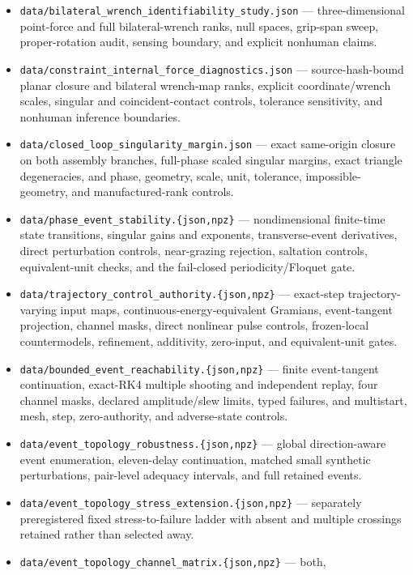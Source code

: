 \documentclass[
  letterpaper,
]{report}
\begin{document}
\begin{itemize}
  arrays.
\item
  \texttt{data/bilateral\_wrench\_identifiability\_study.json} ---
  three-dimensional point-force and full bilateral-wrench ranks, null
  spaces, grip-span sweep, proper-rotation audit, sensing boundary, and
  explicit nonhuman claims.
\item
  \texttt{data/constraint\_internal\_force\_diagnostics.json} ---
  source-hash-bound planar closure and bilateral wrench-map ranks,
  explicit coordinate/wrench scales, singular and coincident-contact
  controls, tolerance sensitivity, and nonhuman inference boundaries.
\item
  \texttt{data/closed\_loop\_singularity\_margin.json} --- exact
  same-origin closure on both assembly branches, full-phase scaled
  singular margins, exact triangle degeneracies, and phase, geometry,
  scale, unit, tolerance, impossible- geometry, and manufactured-rank
  controls.
\item
  \texttt{data/phase\_event\_stability.\{json,npz\}} --- nondimensional
  finite-time state transitions, singular gains and exponents,
  transverse-event derivatives, direct perturbation controls,
  near-grazing rejection, saltation controls, equivalent-unit checks,
  and the fail-closed periodicity/Floquet gate.
\item
  \texttt{data/trajectory\_control\_authority.\{json,npz\}} ---
  exact-step trajectory-varying input maps, continuous-energy-equivalent
  Gramians, event-tangent projection, channel masks, direct nonlinear
  pulse controls, frozen-local countermodels, refinement, additivity,
  zero-input, and equivalent-unit gates.
\item
  \texttt{data/bounded\_event\_reachability.\{json,npz\}} --- finite
  event-tangent continuation, exact-RK4 multiple shooting and
  independent replay, four channel masks, declared amplitude/slew
  limits, typed failures, and multistart, mesh, step, zero-authority,
  and adverse-state controls.
\item
  \texttt{data/event\_topology\_robustness.\{json,npz\}} --- global
  direction-aware event enumeration, eleven-delay continuation, matched
  small synthetic perturbations, pair-level adequacy intervals, and full
  retained events.
\item
  \texttt{data/event\_topology\_stress\_extension.\{json,npz\}} ---
  separately preregistered fixed stress-to-failure ladder with absent
  and multiple crossings retained rather than selected away.
\item
  \texttt{data/event\_topology\_channel\_matrix.\{json,npz\}} --- both,

\end{itemize}
\end{document}
